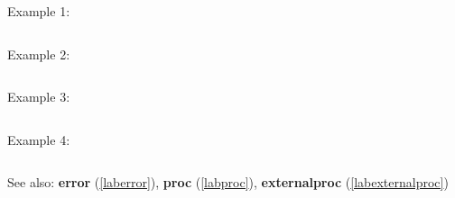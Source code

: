 \noindent Example 1: 
\begin{center}\begin{minipage}{15cm}\begin{Verbatim}[frame=single]
\end{Verbatim}
\end{minipage}\end{center}
\noindent Example 2: 
\begin{center}\begin{minipage}{15cm}\begin{Verbatim}[frame=single]
\end{Verbatim}
\end{minipage}\end{center}
\noindent Example 3: 
\begin{center}\begin{minipage}{15cm}\begin{Verbatim}[frame=single]
\end{Verbatim}
\end{minipage}\end{center}
\noindent Example 4: 
\begin{center}\begin{minipage}{15cm}\begin{Verbatim}[frame=single]
\end{Verbatim}
\end{minipage}\end{center}
See also: \textbf{error} (\ref{laberror}), \textbf{proc} (\ref{labproc}), \textbf{externalproc} (\ref{labexternalproc})

